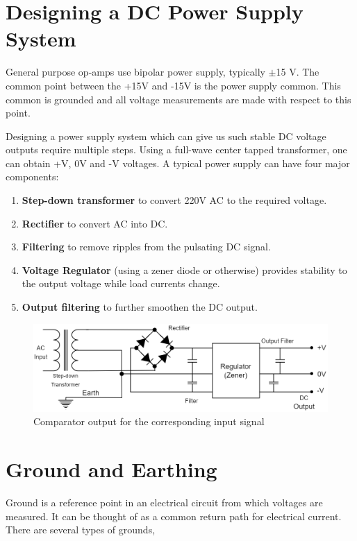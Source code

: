 \section{Designing a DC Power Supply System}

General purpose op-amps use bipolar power supply, typically $\pm$15 V. The common point between the +15V and -15V is the power supply common. This common is grounded and all voltage measurements are made with respect to this point.

Designing a power supply system which can give us such stable DC voltage outputs require multiple steps. Using a full-wave center tapped transformer, one can obtain +V, 0V and -V voltages. A typical power supply can have four major components: 

\begin{enumerate}
    \item \textbf{Step-down transformer} to convert 220V AC to the required voltage.
    \item \textbf{Rectifier} to convert AC into DC.
    \item \textbf{Filtering} to remove ripples from the pulsating DC signal.
    \item \textbf{Voltage Regulator} (using a zener diode or otherwise) provides stability to the output voltage while load currents change.
    \item \textbf{Output filtering} to further smoothen the DC output.
\end{enumerate}

\begin{figure}[H]
    \centering
    \includegraphics[width=0.85\columnwidth]{images/ps.drawio.png}
    \caption{Comparator output for the corresponding input signal}
    \label{power supply}
\end{figure}

\section{Ground and Earthing}
Ground is a reference point in an electrical circuit from which voltages are measured. It can be thought of as a common return path for electrical current. There are several types of grounds,\\

